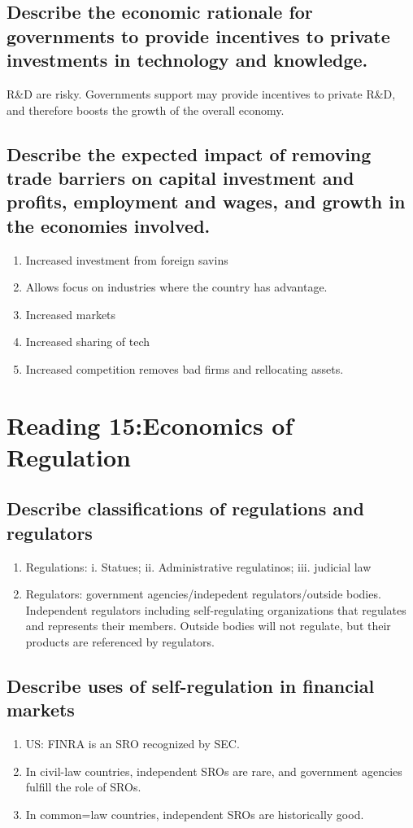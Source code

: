 \documentclass{article}
\newcommand{\be}{\begin{enumerate}}
\newcommand{\ee}{\end{enumerate}}
\begin{document}
\subsection{Describe the economic rationale for governments to provide 
incentives to private investments in technology and knowledge.}
R\&D are risky. Governments support may provide incentives to private R\&D, and therefore
boosts the growth of the overall economy.
\subsection{Describe the expected impact of removing trade barriers on capital investment 
and profits, employment and wages, and growth in the economies involved.}
\be
    \item Increased investment from foreign savins
    \item Allows focus on industries where the country has advantage.
    \item Increased markets
    \item Increased sharing of tech
    \item Increased competition removes bad firms and rellocating assets.
\ee

\section{Reading 15:Economics of Regulation}
\subsection{Describe classifications of regulations and regulators}
\be
    \item Regulations: i. Statues; ii. Administrative regulatinos; iii. judicial law
    \item Regulators: government agencies/indepedent regulators/outside bodies. Independent regulators
        including self-regulating organizations that regulates and represents their members.
        Outside bodies will not regulate, but their products are referenced by regulators.
\ee
\subsection{Describe uses of self-regulation in financial markets}
\be
    \item US: FINRA is an SRO recognized by SEC.
    \item In civil-law countries, independent SROs are rare, and government agencies
        fulfill the role of SROs.
    \item In common=law countries, independent SROs are historically good.
\ee
\end{document}
